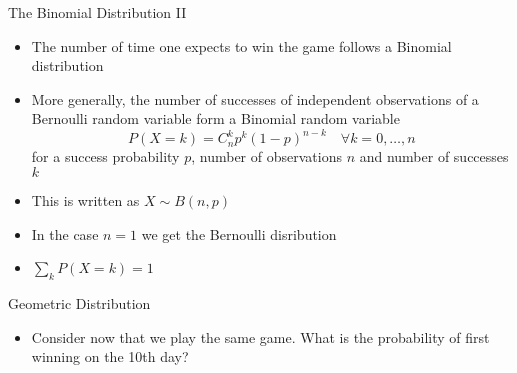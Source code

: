 \documentclass{beamer}
\begin{document}
\begin{frame}{The Binomial Distribution II} 
\begin{itemize} 
 \item The number of time one expects to win the game follows a Binomial distribution 
\item More generally, the number of successes of independent observations of a Bernoulli random variable form a Binomial random variable 
\begin{displaymath} 
 P(X = k) = C^k_n p^k (1-p)^{n-k} \quad \forall k = 0, \ldots, n
\end{displaymath}
for a success probability $p$, number of observations $n$ and number of successes $k$ 
\item This is written as $X \sim B(n, p)$ 
\item In the case $n=1$ we get the Bernoulli disribution 
\item $\sum_k P(X = k) = 1$  
\end{itemize}
\end{frame}

\begin{frame}{Geometric Distribution} 
\begin{itemize} 
 \item Consider now that we play the same game. What is the probability of first winning on the 10th day? 
\end{itemize}

\end{frame}
\end{document}
